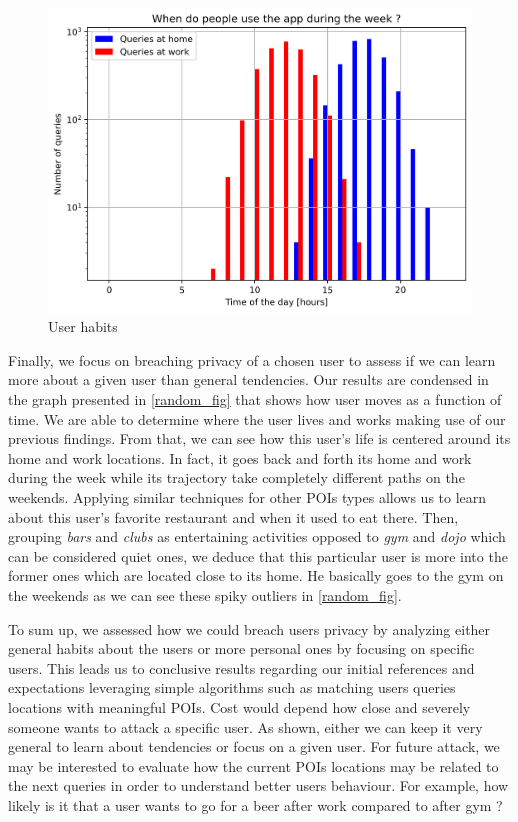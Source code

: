 \documentclass[10pt,conference,compsocconf]{IEEEtran}
\begin{document}
\begin{figure}
  \includegraphics[width=\columnwidth]{when.png}
  \caption{User habits}
  \label{when_fig}
\end{figure}

Finally, we focus on breaching privacy of a chosen user to assess if we can learn more about a given user than general tendencies. Our results are condensed in the graph presented in \ref{random_fig} that shows how user moves as a function of time. We are able to determine where the user lives and works making use of our previous findings. From that, we can see how this user's life is centered around its home and work locations. In fact, it goes back and forth its home and work during the week while its trajectory take completely different paths on the weekends. Applying similar techniques for other POIs types allows us to learn about this user's favorite restaurant and when it used to eat there. Then, grouping \textit{bars} and \textit{clubs} as entertaining activities opposed to \textit{gym} and \textit{dojo} which can be considered quiet ones, we deduce that this particular user is more into the former ones which are located close to its home. He basically goes to the gym on the weekends as we can see these spiky outliers in \ref{random_fig}.

To sum up, we assessed how we could breach users privacy by analyzing either general habits about the users or more personal ones by focusing on specific users. This leads us to conclusive results regarding our initial references and expectations leveraging simple algorithms such as matching users queries locations with meaningful POIs. Cost would depend how close and severely someone wants to attack a specific user. As shown, either we can keep it very general to learn about tendencies or focus on a given user. For future attack, we may be interested to evaluate how the current POIs locations may be related to the next queries in order to understand better users behaviour. For example, how likely is it that a user wants to go for a beer after work compared to after gym ?
\end{document}
